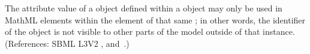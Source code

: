 The  attribute value of a \LocalParameter object defined within a
\KineticLaw object may only be used in MathML  elements within
the  element of that same \KineticLaw; in other words, the
identifier of the \LocalParameter object is not visible to other parts of
the model outside of that \KineticLaw instance.  (References: SBML L3V2
, 
and~.)
